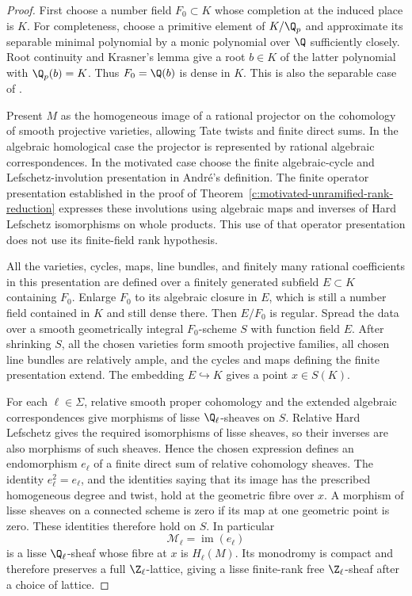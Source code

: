 \begin{proof}
First choose a number field $F_0\subset K$ whose completion at the
induced place is $K$.
For completeness, choose a primitive element of $K/\Q_p$ and
approximate its separable minimal polynomial by a monic polynomial
over $\Q$ sufficiently closely. Root continuity and Krasner's lemma
give a root $b\in K$ of the latter polynomial with
$\Q_p(b)=K$. Thus $F_0=\Q(b)$ is dense in $K$.
This is also the separable case of
\citet[Theorem~2.1 and its proof, pp.~2--3]
{c_conrad_localglobal}.

Present $M$ as the homogeneous image of a rational projector on the
cohomology of smooth projective varieties, allowing Tate twists and
finite direct sums. In the algebraic homological case the projector
is represented by rational algebraic correspondences.
In the motivated case choose the finite algebraic-cycle and
Lefschetz-involution presentation in Andr\'e's definition.
The finite operator presentation established in the proof of
Theorem~\ref{c:motivated-unramified-rank-reduction} expresses these
involutions using algebraic maps and inverses of Hard Lefschetz
isomorphisms on whole products.
This use of that operator presentation does not use its
finite-field rank hypothesis.

All the varieties, cycles, maps, line bundles, and finitely many
rational coefficients in this presentation are defined over a
finitely generated subfield $E\subset K$ containing $F_0$.
Enlarge $F_0$ to its algebraic closure in $E$, which is still a
number field contained in $K$ and still dense there.
Then $E/F_0$ is regular. Spread the data over a smooth geometrically
integral $F_0$-scheme $S$ with function field $E$.
After shrinking $S$, all the chosen varieties form smooth projective
families, all chosen line bundles are relatively ample, and the
cycles and maps defining the finite presentation extend.
The embedding $E\hookrightarrow K$ gives a point $x\in S(K)$.

For each $\ell\in\Sigma$, relative smooth proper cohomology and
the extended algebraic correspondences give morphisms of lisse
$\Q_\ell$-sheaves on $S$. Relative Hard Lefschetz gives the
required isomorphisms of lisse sheaves, so their inverses are also
morphisms of such sheaves. Hence the chosen expression defines
an endomorphism $e_\ell$ of a finite direct sum of relative
cohomology sheaves.
The identity $e_\ell^2=e_\ell$, and the identities saying that
its image has the prescribed homogeneous degree and twist, hold
at the geometric fibre over $x$.
A morphism of lisse sheaves on a connected scheme is zero if its
map at one geometric point is zero. These identities therefore
hold on $S$. In particular
\[
 \mathcal M_\ell=\operatorname{im}(e_\ell)
\]
is a lisse $\Q_\ell$-sheaf whose fibre at $x$ is $H_\ell(M)$.
Its monodromy is compact and therefore preserves a full
$\Z_\ell$-lattice, giving a lisse finite-rank free
$\Z_\ell$-sheaf after a choice of lattice.


\end{proof}
